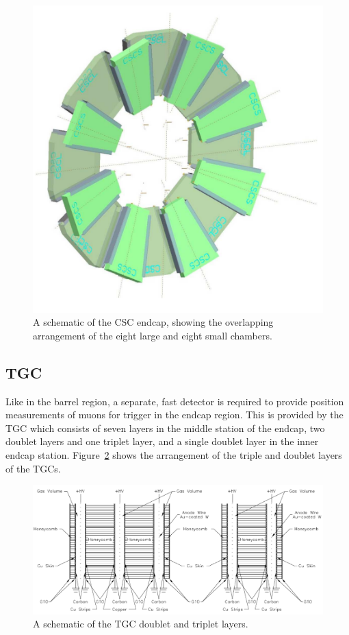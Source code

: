 \begin{figure}[hbtp]
\includegraphics[width=\fullfig]{figures/csc_schematic.png}
\caption{A schematic of the \ac{CSC} endcap, showing the overlapping arrangement of the eight large and eight small chambers.}
\label{fig:csc_schematic}
\end{figure}

\subsection{\acl{TGC}}
Like in the barrel region, a separate, fast detector is required to provide position measurements of muons for trigger in the endcap region.
This is provided by the \ac{TGC} which consists of seven layers in the middle station of the endcap, two doublet layers and one triplet layer, and a single doublet layer in the inner endcap station.
Figure~\ref{fig:tgc_schematic} shows the arrangement of the triple and doublet layers of the \acp{TGC}.

\begin{figure}[hbtp]
\includegraphics[width=\fullfig]{figures/tgc_schematic.pdf}
\caption{A schematic of the \ac{TGC} doublet and triplet layers.}
\label{fig:tgc_schematic}
\end{figure}


